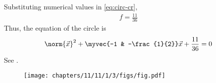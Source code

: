 Substituting numerical values
	in \eqref{eq:circ-cr},
\begin{align}
	f
	=\frac{11}{36}
\end{align}
	Thus, the equation of the circle is
\begin{align}
	\norm{\vec{x}}^2 + \myvec{-1 & -\frac{1}{2}}\vec{x}+\frac{11}{36}=0
\end{align}
See .
\begin{figure}[H]
\begin{center}
\texttt{[image: chapters/11/11/1/3/figs/fig.pdf]}
\end{center}
\caption{}
\label{fig:chapters/11/11/1/3/Fig1}
\end{figure}
